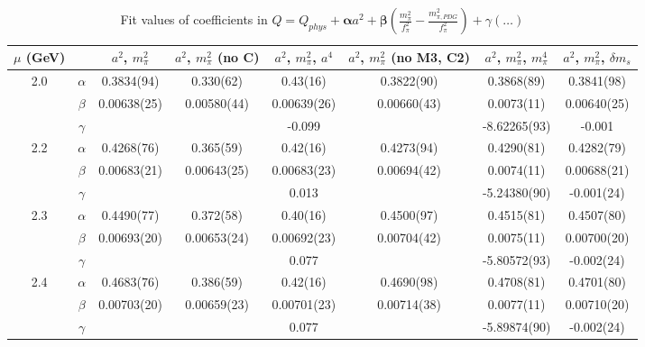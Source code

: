 \documentclass[12pt]{extarticle}
\begin{document}
\begin{table}[h!]
\begin{center}
\begin{tabular}{|c c|c|c|c|c|c|c|}
\hline
$\mu$ (GeV) &  & $a^2$, $m_\pi^2$& $a^2$, $m_\pi^2$ (no C)& $a^2$, $m_\pi^2$, $a^4$& $a^2$, $m_\pi^2$ (no M3, C2)& $a^2$, $m_\pi^2$, $m_\pi^4$& $a^2$, $m_\pi^2$, $\delta m_s$\\
\hline
\multirow{3}{0.5in}{2.0} & $\alpha$ & 0.3834(94)& 0.330(62)& 0.43(16)& 0.3822(90)& 0.3868(89)& 0.3841(98)\\
 & $\beta$ & 0.00638(25)& 0.00580(44)& 0.00639(26)& 0.00660(43)& 0.0073(11)& 0.00640(25)\\
 & $\gamma$ &  &  & -0.099&  & -8.62265(93)& -0.001\\
\hline
\multirow{3}{0.5in}{2.2} & $\alpha$ & 0.4268(76)& 0.365(59)& 0.42(16)& 0.4273(94)& 0.4290(81)& 0.4282(79)\\
 & $\beta$ & 0.00683(21)& 0.00643(25)& 0.00683(23)& 0.00694(42)& 0.0074(11)& 0.00688(21)\\
 & $\gamma$ &  &  & 0.013&  & -5.24380(90)& -0.001(24)\\
\hline
\multirow{3}{0.5in}{2.3} & $\alpha$ & 0.4490(77)& 0.372(58)& 0.40(16)& 0.4500(97)& 0.4515(81)& 0.4507(80)\\
 & $\beta$ & 0.00693(20)& 0.00653(24)& 0.00692(23)& 0.00704(42)& 0.0075(11)& 0.00700(20)\\
 & $\gamma$ &  &  & 0.077&  & -5.80572(93)& -0.002(24)\\
\hline
\multirow{3}{0.5in}{2.4} & $\alpha$ & 0.4683(76)& 0.386(59)& 0.42(16)& 0.4690(98)& 0.4708(81)& 0.4701(80)\\
 & $\beta$ & 0.00703(20)& 0.00659(23)& 0.00701(23)& 0.00714(38)& 0.0077(11)& 0.00710(20)\\
 & $\gamma$ &  &  & 0.077&  & -5.89874(90)& -0.002(24)\\
\hline
\end{tabular}
\caption{Fit values of coefficients in $Q = Q_{phys} + \mathbf{\alpha} a^2 + \mathbf{\beta}\left(\frac{m_\pi^2}{f_\pi^2}-\frac{m_{\pi,PDG}^2}{f_\pi^2}\right) + \gamma(\ldots)$}
\end{center}
\end{table}







\end{document}
